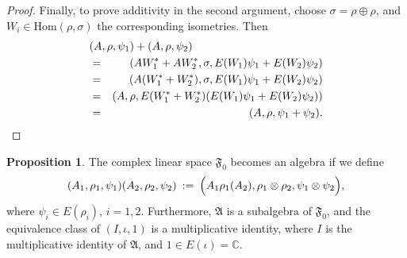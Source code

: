 \documentclass[11pt]{article}
\newcommand{\alg}[1]{\mathfrak{#1}}
\theoremstyle{definition}
\newtheorem{prop}[thm]{Proposition}
\theoremstyle{definition}
\theoremstyle{remark}
\def\7#1{{\mathbb #1}}
\newcommand{\Hom}{\mathrm{Hom}}
\begin{document}
\begin{proof}
Finally, to prove additivity in the second argument, choose $\sigma =\rho \oplus
\rho$, and $W_i\in \Hom (\rho ,\sigma )$ the corresponding isometries.  Then
\begin{eqnarray*}
  \lefteqn{ (A,\rho ,\psi _1)+(A,\rho ,\psi _2) } \\
  & =& (AW_1^*+AW_2^*,\sigma ,E(W_1)\psi _1+E(W_2)\psi _2 )  \\ 
  &=& (A(W_1^*+W_2^*),\sigma ,E(W_1)\psi _1+E(W_2)\psi _2 ) \\
  &=& (A,\rho ,E(W_1^*+W_2^*)(E(W_1)\psi _1+E(W_2)\psi _2 ) ) \\
  &=& (A,\rho ,\psi _1+\psi _2).\end{eqnarray*}  
\end{proof}

\begin{prop} The complex linear space $\alg{F}_0 $ becomes an algebra if we define
  \begin{equation} (A_1,\rho _1,\psi _1)(A_2,\rho _2,\psi _2)\: := \: \Bigl( A_1\rho
    _1(A_2),\rho _1\otimes \rho _2,\psi _1\otimes \psi _2 \Bigr) ,\label{multiply}
  \end{equation} where $\psi _i\in E(\rho _i)$, $i=1,2$.  Furthermore, $\alg{A}$ is a
  subalgebra of $\alg{F}_0 $, and the equivalence class of $(I,\iota ,1)$ is a
  multiplicative identity, where $I$ is the multiplicative identity of $\alg{A}$,
  and $1\in E(\iota )=\7C$.  \end{prop}
\end{document}
